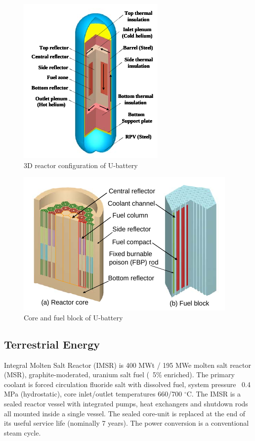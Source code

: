 \begin{figure}[htbp]
\centering
\includegraphics[scale=1]{Figs/ubattery3d.jpeg}
\caption{ 3D reactor configuration of U-battery}
\label{u3d}
\end{figure}

\begin{figure}[htbp]
\centering
\includegraphics[scale=1]{Figs/ubatterycore.jpeg}
\caption{ Core and fuel block of U-battery}
\label{ucore}
\end{figure}


\pagebreak
\subsection{Terrestrial Energy}
Integral Molten Salt Reactor (IMSR) is 400 MWt / 195 MWe molten salt reactor (MSR), graphite-moderated, uranium salt fuel (~5\% enriched). The primary coolant is forced circulation fluoride salt with dissolved fuel, system pressure ~0.4 MPa (hydrostatic), core inlet/outlet temperatures 660/700 $^\circ{}$C. The IMSR is a sealed reactor vessel with integrated pumps, heat exchangers and shutdown rods all mounted inside a single vessel. The sealed core-unit is replaced at the end of its useful service life (nominally 7 years). The power conversion is a conventional steam cycle.

